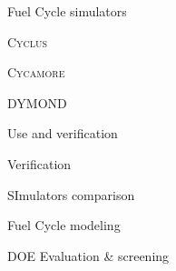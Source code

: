 \documentclass{report}
\newcommand{\Cyclus}{\textsc{Cyclus}\xspace}%
\newcommand{\Cycamore}{\textsc{Cycamore}\xspace}%
\begin{document}
\begin{outline}
\begin{outline}
    \item Fuel Cycle simulators
    \begin{outline}
        \item \Cyclus \cite{huff_fundamental_2016}
        \begin{outline}
              \item \Cycamore \cite{scopatz_cyclus_2015}
        \end{outline}
        \item DYMOND \cite{feng_standardized_2016}
        \item Use and verification 
        \begin{outline}
            \item Verification \cite{feng_standardized_2016,bae_standardized_2019}
            \item SImulators comparison \cite{djokic_application_2015}
        \end{outline}
    \end{outline}
    \item Fuel Cycle modeling
    \begin{outline}
          \item \gls{DOE} Evaluation \& screening \cite{wigeland_nuclear_2014}
          \begin{outline}
                \item 
          \end{outline}
    \end{outline}
\end{outline}


\end{outline}
\end{document}
